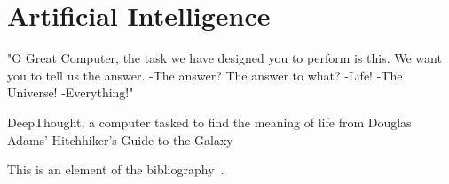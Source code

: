 \section{Artificial Intelligence}
\epigraph{"O Great Computer, the task we have designed you to perform is this. We want you to tell us the answer. -The answer? The answer to what? -Life! -The Universe! -Everything!"}{DeepThought, a computer tasked to find the meaning of life from Douglas Adams' Hitchhiker's Guide to the Galaxy}

This is an element of the bibliography~\cite{2022}.
\subsection{}
\subsection{}